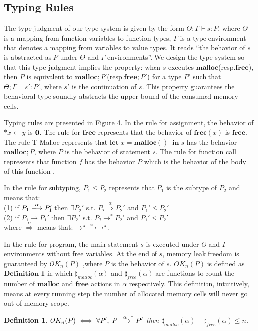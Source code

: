 \documentclass[english]{jssst_ppl} %
\newcommand\LET{\mathbf{let}\;}
\newcommand\IN{\mathbf{in}\;}
\newcommand\MALLOC{\mathbf{malloc()}\;}
\newcommand\Malloc{\mathbf{malloc}}
\newcommand\Free{\mathbf{free}}
\newcommand\Cirx{(x)}
\newtheorem{myDef}{Definition}
\theoremstyle{definition}
\begin{document}
\subsection{Typing Rules}
The type judgment of our type system is given by the form $\Theta ; \Gamma \vdash s : P$, where $\Theta$ is a mapping from function variables to function types, $\Gamma$ is a type environment that denotes a mapping from variables to value types.
It reads ``the behavior of $s$ is abstracted as $P$ under $\Theta$ and $\Gamma$ environments''. We design the type system so that this type judgment implies the property: when $s$ executes $\Malloc$(resp.$\Free$), then $P$ is equivalent to $\Malloc;P'$(resp.$\Free;P'$) for a type $P'$ such that $\Theta; \Gamma \vdash s': P'$, where $s'$ is the continuation of $s$. This property guarantees the behavioral type soundly abstracts the upper bound of the consumed memory cells.

Typing rules are presented in Figure 4. In the rule for assignment, the behavior of  $*x \leftarrow y$ is $\bf 0$. The rule for $\Free$ represents that the behavior of $\Free \Cirx$ is $\Free$. The rule T-Malloc represents that $\LET x = \MALLOC \; \IN s$ has the behavior $\Malloc;P$, where $P$ is the behavior of statement $s$. The rule for function call represents that function $f$ has the behavior $P$ which is the behavior of the body of this function .

In the rule for subtyping, $P_{1} \le P_{2}$ represents that $P_{1}$ is the subtype of $P_{2}$ and  means that: \\
(1) if $P_{1} \xlongrightarrow{\alpha}  P_{1}'$ then $\exists P_{2}' $ s.t. $P_{2} \overset{\text{$\alpha$}}{\Longrightarrow} P_{2}'$ and $ P_{1}' \le P_{2}' $\\
(2) if $P_{1} \rightarrow P_{1}'$ then $\exists P_{2}'$ s.t. $P_{2} \rightarrow^{*} P_{2}'$ and  $P_{1}' \le P_{2}'$\\
where $\overset{\text{$\alpha$}}{\Longrightarrow}$ means that: $\rightarrow^{*} \xlongrightarrow{\alpha} \rightarrow^{*}$.

In the rule for program, the main statement $s$ is executed under $\Theta$ and $\Gamma$ environments without free variables. At the end of $s$, memory leak freedom is guaranteed by $OK_{n}(P)$ ,where $P$ is the behavior of $s$. $OK_{n}(P)$ is defined as $\mathbf{Definition\; 1}$ in which $\sharp_{malloc}(\alpha)$ and $\sharp_{free}(\alpha)$ are functions to count the number of $\Malloc$ and $\Free$ actions in $\alpha$ respectively. This definition, intuitively, means at every running step the number of allocated memory cells will never go out of memory scope.
\begin{myDef}
 $OK_{n}(P) \iff \forall P',\; P \xlongrightarrow{\alpha}^{*}P'$ then $\sharp_{malloc}(\alpha)-\sharp_{free}(\alpha)\le n$.
\end{myDef}
\end{document}
